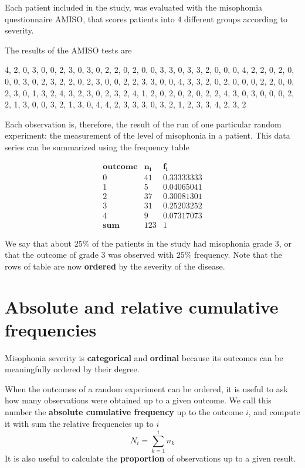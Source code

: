\documentclass[
]{book}
\begin{document}
Each patient included in the study, was evaluated with the misophomia questionnaire AMISO, that scores patients into \(4\) different groups according to severity.

The results of the AMISO tests are

4, 2, 0, 3, 0, 0, 2, 3, 0, 3, 0, 2, 2, 0, 2, 0, 0, 3, 3, 0, 3, 3, 2, 0, 0, 0, 4, 2, 2, 0, 2, 0, 0, 0, 3, 0, 2, 3, 2, 2, 0, 2, 3, 0, 0, 2, 2, 3, 3, 0, 0, 4, 3, 3, 2, 0, 2, 0, 0, 0, 2, 2, 0, 0, 2, 3, 0, 1, 3, 2, 4, 3, 2, 3, 0, 2, 3, 2, 4, 1, 2, 0, 2, 0, 2, 0, 2, 2, 4, 3, 0, 3, 0, 0, 0, 2, 2, 1, 3, 0, 0, 3, 2, 1, 3, 0, 4, 4, 2, 3, 3, 3, 0, 3, 2, 1, 2, 3, 3, 4, 2, 3, 2

Each observation is, therefore, the result of the run of one particular random experiment: the measurement of the level of misophonia in a patient. This data series can be summarized using the frequency table

\[
\begin{array}{ccc}
\mathbf{outcome} & \mathbf{n_i} & \mathbf{f_i} \\
0   & 41    & 0.33333333  \\
1   & 5     & 0.04065041  \\
2   & 37    & 0.30081301  \\ 
3   & 31    & 0.25203252  \\
4   & 9     & 0.07317073  \\ \hline
\mathbf{sum} & 123 & 1
\end{array}
\]

We say that about \(25\%\) of the patients in the study had misophonia grade \(3\), or that the outcome of grade \(3\) was observed with \(25\%\) frequency. Note that the rows of table are now \textbf{ordered} by the severity of the disease.

\hypertarget{absolute-and-relative-cumulative-frequencies}{%
\section{Absolute and relative cumulative frequencies}\label{absolute-and-relative-cumulative-frequencies}}

Misophonia severity is \textbf{categorical} and \textbf{ordinal} because its outcomes can be meaningfully ordered by their degree.

When the outcomes of a random experiment can be ordered, it is useful to ask how many observations were obtained up to a given outcome. We call this number the \textbf{absolute cumulative frequency} up to the outcome \(i\), and compute it with sum the relative frequencies up to \(i\)
\[N_i =\sum_{k= 1}^i n_k\]
It is also useful to calculate the \textbf{proportion} of observations up to a given result.
\end{document}
